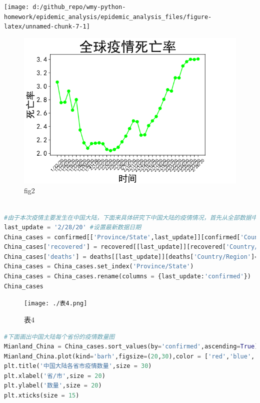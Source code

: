 \documentclass[UTF8,a4paper,12pt]{ctexart}  %
\begin{document}
\begin{center}\texttt{[image: d:/github\_repo/wmy-python-homework/epidemic\_analysis/epidemic\_analysis\_files/figure-latex/unnamed-chunk-7-1]} \end{center}

\begin{figure}
\centering
\includegraphics{./fig2.png}
\caption{fig2}
\end{figure}

\begin{lstlisting}[language=Python]

#由于本次疫情主要发生在中国大陆，下面来具体研究下中国大陆的疫情情况，首先从全部数据中提取出中国大陆的数据。里面包含了省份，以及每个省最新的确诊数，治愈数，死亡数。
last_update = '2/28/20' #设置最新数据日期
China_cases = confirmed[['Province/State',last_update]][confirmed['Country/Region']=='Mainland China']
China_cases['recovered'] = recovered[[last_update]][recovered['Country/Region']=='Mainland China']
China_cases['deaths'] = deaths[[last_update]][deaths['Country/Region']=='Mainland China']
China_cases = China_cases.set_index('Province/State')
China_cases = China_cases.rename(columns = {last_update:'confirmed'})
China_cases
\end{lstlisting}

\begin{figure}
\centering
\texttt{[image: ./表4.png]}
\caption{表4}
\end{figure}

\begin{lstlisting}[language=Python]
#下面画出中国大陆每个省份的疫情数量图
Mianland_China = China_cases.sort_values(by='confirmed',ascending=True)
Mianland_China.plot(kind='barh',figsize=(20,30),color = ['red','blue','lime'],width = 1,rot = 2)
plt.title('中国大陆各省市疫情数量',size = 30)
plt.xlabel('省/市',size = 20)
plt.ylabel('数量',size = 20)
plt.xticks(size = 15)
\end{lstlisting}
\end{document}
